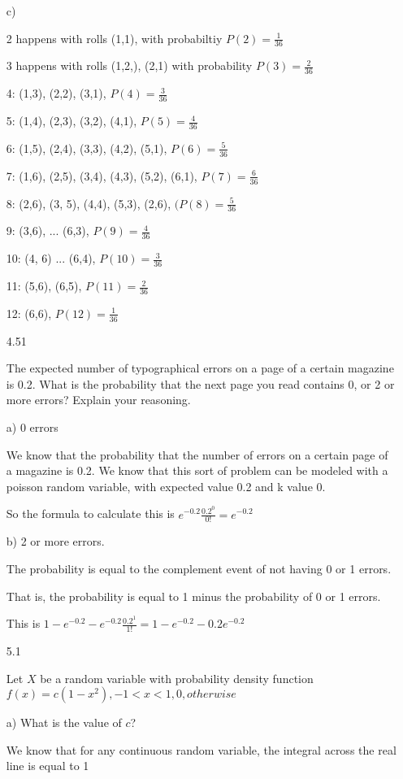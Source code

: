 \documentclass[11pt]{article}
\begin{document}
\begin{itemize}
	c) 

	2 happens with rolls (1,1), with probabiltiy $P(2) = \frac{1}{36}$

	3 happens with rolls (1,2,), (2,1) with probability $P(3) = \frac{2}{36}$

	4: (1,3), (2,2), (3,1), $P(4) = \frac{3}{36}$

	5: (1,4), (2,3), (3,2), (4,1), $P(5) = \frac{4}{36}$

	6: (1,5), (2,4), (3,3), (4,2), (5,1), $P(6) = \frac{5}{36}$

	7: (1,6), (2,5), (3,4), (4,3), (5,2), (6,1), $P(7) = \frac{6}{36}$

	8: (2,6), (3, 5), (4,4), (5,3), (2,6), $(P(8) = \frac{5}{36}$

	9: (3,6), ... (6,3), $P(9) = \frac{4}{36}$

	10: (4, 6) ... (6,4), $P(10) = \frac{3}{36}$

	11: (5,6), (6,5), $P(11) = \frac{2}{36}$

	12: (6,6), $P(12) = \frac{1}{36}$

\item[4.51]

	The expected number of typographical errors on a page of a certain magazine is 0.2. What is the probability that the next page you read contains 0, or 2 or more errors? Explain your reasoning.

	a) 0 errors

	We know that the probability that the number of errors on a certain page of a magazine is 0.2. We know that this sort of problem can be modeled with a poisson random variable, with expected value 0.2 and k value 0.
	
	So the formula to calculate this is $e^{-0.2} \frac{0.2^0}{0!} = e^{-0.2}$

	b) 2 or more errors.

	The probability is equal to the complement event of not having 0 or 1 errors.

	That is, the probability is equal to 1 minus the probability of 0 or 1 errors.

	This is $1 - e^{-0.2} - e^{-0.2} \frac{0.2^1}{1!} = 1 - e^{-0.2} - 0.2e^{-0.2}$

\item[5.1]

  Let $X$ be a random variable with probability density function $f(x) = c(1-x^2), -1 < x < 1, 0, otherwise$

  a) What is the value of $c$?

  We know that for any continuous random variable, the integral across the real line is equal to 1


\end{itemize}
\end{document}
